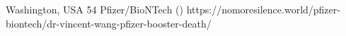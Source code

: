           {Washington, USA}
          {54}
          {Pfizer/BioNTech}
          {}
          {
             ()
          }
          {https://nomoresilence.world/pfizer-biontech/dr-vincent-wang-pfizer-booster-death/}
